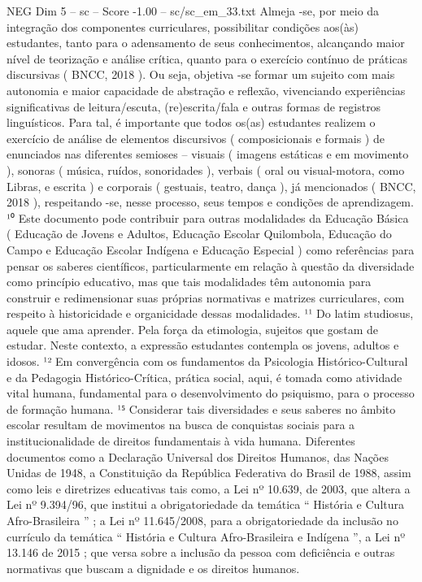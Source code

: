 \begin{textsample}{NEG Dim 5 – sc – Score -1.00 – sc/sc\_em\_33.txt}
Almeja -se, por meio da integração dos componentes curriculares, possibilitar condições aos(às) estudantes, tanto para o adensamento de seus conhecimentos, alcançando maior nível de teorização e análise crítica, quanto para o exercício contínuo de práticas discursivas ( BNCC, 2018 ).
Ou seja, objetiva -se formar um sujeito com mais autonomia e maior capacidade de abstração e reflexão, vivenciando experiências significativas de leitura/escuta, (re)escrita/fala e outras formas de registros linguísticos.
Para tal, é importante que todos os(as) estudantes realizem o exercício de análise de elementos discursivos ( composicionais e formais ) de enunciados nas diferentes semioses – visuais ( imagens estáticas e em movimento ), sonoras ( música, ruídos, sonoridades ), verbais ( oral ou visual-motora, como Libras, e escrita ) e corporais ( gestuais, teatro, dança ), já mencionados ( BNCC, 2018 ), respeitando -se, nesse processo, seus tempos e condições de aprendizagem. ¹⁰ Este documento pode contribuir para outras modalidades da Educação Básica ( Educação de Jovens e Adultos, Educação Escolar Quilombola, Educação do Campo e Educação Escolar Indígena e Educação Especial ) como referências para pensar os saberes científicos, particularmente em relação à questão da diversidade como princípio educativo, mas que tais modalidades têm autonomia para construir e redimensionar suas próprias normativas e matrizes curriculares, com respeito à historicidade e organicidade dessas modalidades. ¹¹ Do latim studiosus, aquele que ama aprender.
Pela força da etimologia, sujeitos que gostam de estudar.
Neste contexto, a expressão estudantes contempla os jovens, adultos e idosos. ¹² Em convergência com os fundamentos da Psicologia Histórico-Cultural e da Pedagogia Histórico-Crítica, prática social, aqui, é tomada como atividade vital humana, fundamental para o desenvolvimento do psiquismo, para o processo de formação humana. ¹⁵ Considerar tais diversidades e seus saberes no âmbito escolar resultam de movimentos na busca de conquistas sociais para a institucionalidade de direitos fundamentais à vida humana.
Diferentes documentos como a Declaração Universal dos Direitos Humanos, das Nações Unidas de 1948, a Constituição da República Federativa do Brasil de 1988, assim como leis e diretrizes educativas tais como, a Lei nº 10.639, de 2003, que altera a Lei nº 9.394/96, que institui a obrigatoriedade da temática “ História e Cultura Afro-Brasileira ” ; a Lei nº 11.645/2008, para a obrigatoriedade da inclusão no currículo da temática “ História e Cultura Afro-Brasileira e Indígena ”, a Lei nº 13.146 de 2015 ; que versa sobre a inclusão da pessoa com deficiência e outras normativas que buscam a dignidade e os direitos humanos.

\end{textsample}
